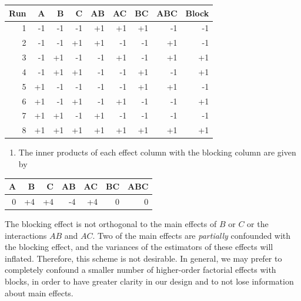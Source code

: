 \documentclass[
]{book}
\providecommand{\tightlist}{%
  \setlength{\itemsep}{0pt}\setlength{\parskip}{0pt}}
\theoremstyle{definition}
\theoremstyle{definition}
\theoremstyle{definition}
\theoremstyle{definition}
\theoremstyle{remark}
\begin{document}
\begin{longtable}[]{@{}rrrrrrrrr@{}}
\toprule()
Run & A & B & C & AB & AC & BC & ABC & Block \\
\midrule()
\endhead
1 & -1 & -1 & -1 & +1 & +1 & +1 & -1 & -1 \\
2 & -1 & -1 & +1 & +1 & -1 & -1 & +1 & -1 \\
3 & -1 & +1 & -1 & -1 & +1 & -1 & +1 & +1 \\
4 & -1 & +1 & +1 & -1 & -1 & +1 & -1 & +1 \\
5 & +1 & -1 & -1 & -1 & -1 & +1 & +1 & -1 \\
6 & +1 & -1 & +1 & -1 & +1 & -1 & -1 & +1 \\
7 & +1 & +1 & -1 & +1 & -1 & -1 & -1 & -1 \\
8 & +1 & +1 & +1 & +1 & +1 & +1 & +1 & +1 \\
\bottomrule()
\end{longtable}

\begin{enumerate}
\def\labelenumi{\alph{enumi}.}
\setcounter{enumi}{1}
\tightlist
\item
  The inner products of each effect column with the blocking column are given by
\end{enumerate}

\begin{longtable}[]{@{}rrrrrrr@{}}
\toprule()
A & B & C & AB & AC & BC & ABC \\
\midrule()
\endhead
0 & +4 & +4 & -4 & +4 & 0 & 0 \\
\bottomrule()
\end{longtable}

The blocking effect is not orthogonal to the main effects of \(B\) or \(C\) or the interactions \(AB\) and \(AC\). Two of the main effects are \emph{partially} confounded with the blocking effect, and the variances of the estimators of these effects will inflated. Therefore, this scheme is not desirable. In general, we may prefer to completely confound a smaller number of higher-order factorial effects with blocks, in order to have greater clarity in our design and to not lose information about main effects.
\end{document}
